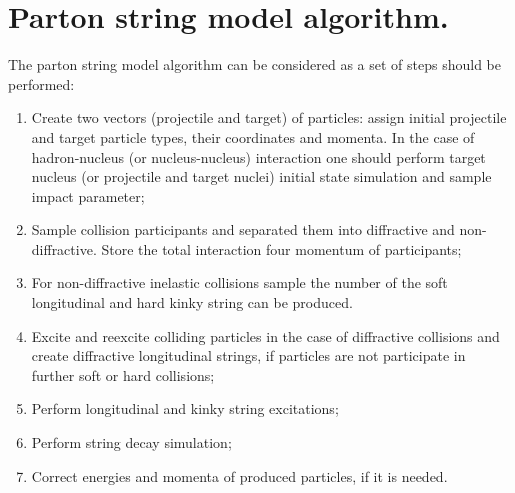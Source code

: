 \section{Parton string model algorithm.}

\hspace{1.0em} 
The parton string model algorithm can be considered as a set of 
steps should be performed:
\begin{enumerate}
\item Create two vectors (projectile and target) of particles: assign initial 
projectile and target particle types, their coordinates and momenta.
In the case of hadron-nucleus (or nucleus-nucleus) interaction 
one should perform
target nucleus (or projectile and target nuclei) initial state simulation
 and sample impact parameter;
\item Sample 
collision participants and separated them into diffractive and non-diffractive.
Store the total interaction four momentum of participants;
\item For non-diffractive inelastic collisions sample the number 
of the soft longitudinal and hard kinky string can be produced.
\item Excite and reexcite colliding particles in the case of diffractive collisions and 
create diffractive longitudinal strings, if particles are not participate in 
further soft or hard collisions;
\item Perform longitudinal and kinky string excitations;
\item Perform string decay simulation;
\item Correct energies and momenta of produced particles, if it is needed.
\end{enumerate}
